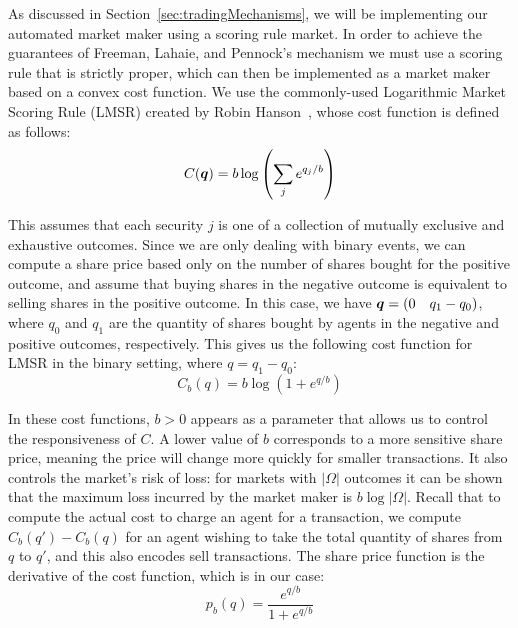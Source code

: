 As discussed in Section~\ref{sec:tradingMechanisms}, we will be implementing
our automated market maker using a scoring rule market. In order to achieve the
guarantees of Freeman, Lahaie, and Pennock's mechanism we must use a scoring
rule that is strictly proper, which can then be implemented as a market maker
based on a convex cost function. We use the commonly-used Logarithmic Market
Scoring Rule (LMSR) created by Robin Hanson~\cite{Hanson2007}, whose cost
function is defined as follows:
%
\begin{equation}
	\label{eq:LMSR}
	C(\bm{q}) = b \log \left( \sum_j e^{q_j/b} \right)
\end{equation}

This assumes that each security $j$ is one of a collection of mutually
exclusive and exhaustive outcomes. Since we are only dealing with binary
events, we can compute a share price based only on the number of shares bought
for the positive outcome, and assume that buying shares in the negative outcome
is equivalent to selling shares in the positive outcome. In this case, we have
$\bm{q}=( 0 \quad q_1 - q_0 )$, where $q_0$ and $q_1$ are the quantity of
shares bought by agents in the negative and positive outcomes, respectively.
This gives us the following cost function for LMSR in the binary setting, where
$q=q_1-q_0$:
%
\begin{equation}
	\label{eq:LMSRbinary}
	C_b (q) = b \log (1 + e^{q/b})
\end{equation}

In these cost functions, $b>0$ appears as a parameter that allows us to control
the responsiveness of $C$. A lower value of $b$ corresponds to a more sensitive
share price, meaning the price will change more quickly for smaller
transactions. It also controls the market's risk of loss: for markets with
$|\Omega|$ outcomes it can be shown that the maximum loss incurred by the
market maker is $b \log |\Omega|$. Recall that to compute the actual cost to
charge an agent for a transaction, we compute $C_b(q')-C_b(q)$ for an agent
wishing to take the total quantity of shares from $q$ to $q'$, and this also
encodes sell transactions. The share price function is the derivative of the
cost function, which is in our case:
%
\begin{equation}
	\label{eq:LMSRprice}
	p_b(q) = \frac{e^{q/b}}{1+e^{q/b}}
\end{equation}

